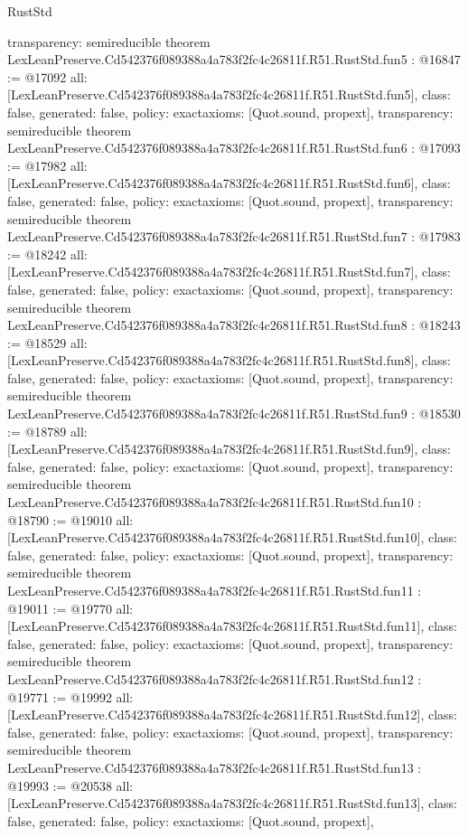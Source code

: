 \begin{lexlean}{RustStd}
\begin{coremodule}
{  transparency: semireducible
}
theorem LexLeanPreserve.Cd542376f089388a4a783f2fc4c26811f.R51.RustStd.fun5 : @16847 := @17092 {
  all: [LexLeanPreserve.Cd542376f089388a4a783f2fc4c26811f.R51.RustStd.fun5],
  class: false,
  generated: false,
  policy: exact{axioms: [Quot.sound, propext]},
  transparency: semireducible
}
theorem LexLeanPreserve.Cd542376f089388a4a783f2fc4c26811f.R51.RustStd.fun6 : @17093 := @17982 {
  all: [LexLeanPreserve.Cd542376f089388a4a783f2fc4c26811f.R51.RustStd.fun6],
  class: false,
  generated: false,
  policy: exact{axioms: [Quot.sound, propext]},
  transparency: semireducible
}
theorem LexLeanPreserve.Cd542376f089388a4a783f2fc4c26811f.R51.RustStd.fun7 : @17983 := @18242 {
  all: [LexLeanPreserve.Cd542376f089388a4a783f2fc4c26811f.R51.RustStd.fun7],
  class: false,
  generated: false,
  policy: exact{axioms: [Quot.sound, propext]},
  transparency: semireducible
}
theorem LexLeanPreserve.Cd542376f089388a4a783f2fc4c26811f.R51.RustStd.fun8 : @18243 := @18529 {
  all: [LexLeanPreserve.Cd542376f089388a4a783f2fc4c26811f.R51.RustStd.fun8],
  class: false,
  generated: false,
  policy: exact{axioms: [Quot.sound, propext]},
  transparency: semireducible
}
theorem LexLeanPreserve.Cd542376f089388a4a783f2fc4c26811f.R51.RustStd.fun9 : @18530 := @18789 {
  all: [LexLeanPreserve.Cd542376f089388a4a783f2fc4c26811f.R51.RustStd.fun9],
  class: false,
  generated: false,
  policy: exact{axioms: [Quot.sound, propext]},
  transparency: semireducible
}
theorem LexLeanPreserve.Cd542376f089388a4a783f2fc4c26811f.R51.RustStd.fun10 : @18790 := @19010 {
  all: [LexLeanPreserve.Cd542376f089388a4a783f2fc4c26811f.R51.RustStd.fun10],
  class: false,
  generated: false,
  policy: exact{axioms: [Quot.sound, propext]},
  transparency: semireducible
}
theorem LexLeanPreserve.Cd542376f089388a4a783f2fc4c26811f.R51.RustStd.fun11 : @19011 := @19770 {
  all: [LexLeanPreserve.Cd542376f089388a4a783f2fc4c26811f.R51.RustStd.fun11],
  class: false,
  generated: false,
  policy: exact{axioms: [Quot.sound, propext]},
  transparency: semireducible
}
theorem LexLeanPreserve.Cd542376f089388a4a783f2fc4c26811f.R51.RustStd.fun12 : @19771 := @19992 {
  all: [LexLeanPreserve.Cd542376f089388a4a783f2fc4c26811f.R51.RustStd.fun12],
  class: false,
  generated: false,
  policy: exact{axioms: [Quot.sound, propext]},
  transparency: semireducible
}
theorem LexLeanPreserve.Cd542376f089388a4a783f2fc4c26811f.R51.RustStd.fun13 : @19993 := @20538 {
  all: [LexLeanPreserve.Cd542376f089388a4a783f2fc4c26811f.R51.RustStd.fun13],
  class: false,
  generated: false,
  policy: exact{axioms: [Quot.sound, propext]},
}
\end{coremodule}
\end{lexlean}
